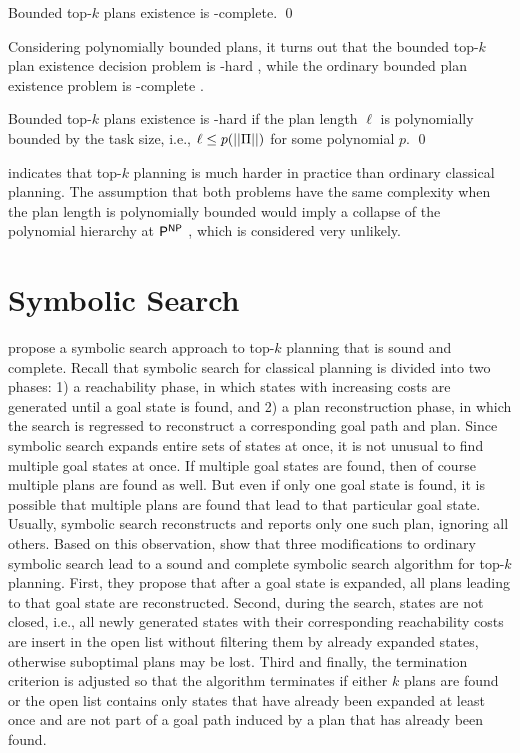 \begin{theorem}\label{thm:bounded-top-k-plan-existence}
    Bounded top-$k$ plans existence is \PSPACE-complete. \qed
\end{theorem}

Considering polynomially bounded plans, it turns out that the bounded \mbox{top-$k$} plan existence decision problem is \PP-hard \autocite{gill-siam-1977,speck-et-al-aaai2020}, while the ordinary bounded plan existence problem is \NP-complete \autocite{bylander-aij1994}.

\begin{theorem}\label{thm:bounded-top-k-plan-existence-short}
    Bounded top-$k$ plans existence is \PP-hard if the plan length $\ell$ is polynomially bounded by the task size, i.e., $\ell \leq p(||\Pi||)$ for some polynomial $p$. \qed
\end{theorem}

 indicates that top-$k$ planning is much harder in practice than ordinary classical planning.
The assumption that both problems have the same complexity when the plan length is polynomially bounded would imply a collapse of the polynomial hierarchy at $\mathsf{P}^{\text{\ensuremath{\mathsf{NP}}}}$ \autocite{toda-siam1991}, which is considered very unlikely.

\section{Symbolic Search}
\textcite{speck-et-al-aaai2020} propose a symbolic search approach to top-$k$ planning that is sound and complete.
Recall that symbolic search for classical planning is divided into two phases: 1) a reachability phase, in which states with increasing costs are generated until a goal state is found, and 2) a plan reconstruction phase, in which the search is regressed to reconstruct a corresponding goal path and plan.
Since symbolic search expands entire sets of states at once, it is not unusual to find multiple goal states at once.
If multiple goal states are found, then of course multiple plans are found as well.
But even if only one goal state is found, it is possible that multiple plans are found that lead to that particular goal state.
Usually, symbolic search reconstructs and reports only one such plan, ignoring all others.
Based on this observation, \textcite{speck-et-al-aaai2020} show that three modifications to ordinary symbolic search lead to a sound and complete symbolic search algorithm for top-$k$ planning.
First, they propose that after a goal state is expanded, all plans leading to that goal state are reconstructed.
Second, during the search, states are not closed, i.e., all newly generated states with their corresponding reachability costs are insert in the open list without filtering them by already expanded states, otherwise suboptimal plans may be lost.
Third and finally, the termination criterion is adjusted so that the algorithm terminates if either $k$ plans are found or the open list contains only states that have already been expanded at least once and are not part of a goal path induced by a plan that has already been found.

